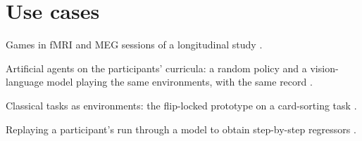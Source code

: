 \section{Use cases}
\label{sec:use-cases}

\begin{outline}
  \item Games in fMRI and MEG sessions of a longitudinal study .
  \item Artificial agents on the participants' curricula: a random policy and a vision-language model playing the same environments, with the same record .
  \item Classical tasks as environments: the flip-locked prototype on a card-sorting task .
  \item Replaying a participant's run through a model to obtain step-by-step regressors .
\end{outline}
